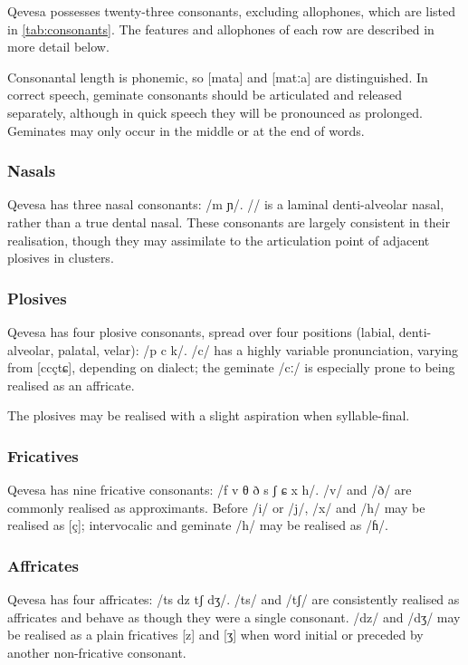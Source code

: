 \documentclass[grammar]{subfiles}
\begin{document}
Qevesa possesses twenty-three consonants, excluding allophones, which are
listed in \cref{tab:consonants}.  The features and allophones of each row are
described in more detail below.

Consonantal length is phonemic, so [mata] and [matːa] are distinguished.  In
correct speech, geminate consonants should be articulated and released
separately, although in quick speech they will be pronounced as prolonged.
Geminates may only occur in the middle or at the end of words.


\subsubsection{Nasals}
\label{sssec:nasals}

Qevesa has three nasal consonants: /m  ɲ/.  // is a laminal
denti-alveolar nasal, rather than a true dental nasal.  These consonants are
largely consistent in their realisation, though they may assimilate to the
articulation point of adjacent plosives in clusters. 


\subsubsection{Plosives}
\label{sssec:plosives}

Qevesa has four plosive consonants, spread over four positions (labial,
denti-alveolar, palatal, velar): /p  c k/.  /c/ has a highly variable
pronunciation, varying from [c\tlde cç\tlde tɕ], depending on dialect; the geminate /cː/
is especially prone to being realised as an affricate. 

The plosives may be realised with a slight aspiration when syllable-final. 


\subsubsection{Fricatives}
\label{sssec:fricatives}

Qevesa has nine fricative consonants: /f v θ ð s ʃ ɕ x h/.  /v/ and /ð/ are
commonly realised as approximants.  Before /i/ or /j/, /x/ and /h/ may be
realised as [ç]; intervocalic and geminate /h/ may be realised as /ɦ/. 


\subsubsection{Affricates}
\label{sssec:affricates}

Qevesa has four affricates: /ts dz tʃ dʒ/.  /ts/ and /tʃ/ are consistently
realised as affricates and behave as though they were a single consonant.  /dz/
and /dʒ/ may be realised as a plain fricatives [z] and [ʒ] when word initial or
preceded by another non-fricative consonant.
\end{document}
